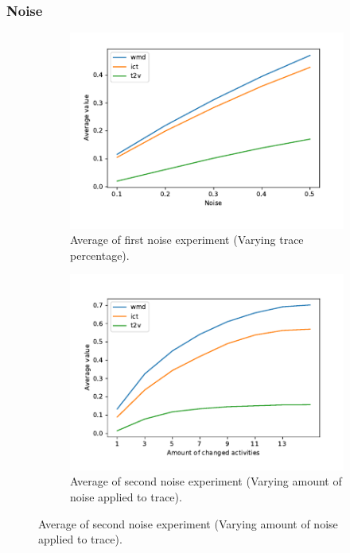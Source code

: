 \documentclass{beamer}
\begin{document}
	\begin{frame}
		\frametitle{Noise}
		\begin{figure}
			\centering
			\begin{subfigure}[b]{0.49\textwidth}
				\centering
				\includegraphics[width=\textwidth]{figures/noise-first}
				\caption{Average of first noise experiment (Varying trace percentage).}
				\label{fig:noise-first}
			\end{subfigure}
			\hfill
			\begin{subfigure}[b]{0.49\textwidth}
				\centering
				\includegraphics[width=\textwidth]{figures/noise-second}
				\caption{Average of second noise experiment (Varying amount of noise applied to trace).}
				\label{fig:noise-second}
			\end{subfigure}
		\end{figure}
	\end{frame}
	
\end{document}
